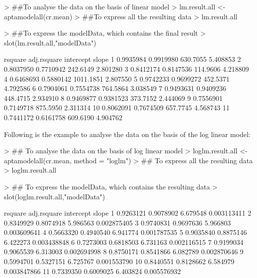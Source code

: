\documentclass[11pt]{article}
\begin{document}
\begin{Schunk}
\begin{Sinput}
> ##To analyse the data on the basis of linear model
> lm.result.all <- aptamodelall(cr.mean)
> ##To express all the resulting data
> lm.result.all
\end{Sinput}
\end{Schunk}

\begin{Schunk}
\begin{Sinput}
> ##To express the modelData, which contains the final result
> slot(lm.result.all,"modelData")
\end{Sinput}
\begin{Soutput}
     rsquare adj.rsquare intercept    slope
1  0.9935984   0.9919980  630.7055 5.408853
2  0.8037950   0.7710942  242.6149 2.801280
3  0.8412174   0.8147536  114.9606 4.218809
4  0.6468693   0.5880142 1011.1851 2.807550
5  0.9742233   0.9699272  452.5371 4.792586
6  0.7904061   0.7554738  764.5864 3.038549
7  0.9493631   0.9409236  448.4715 2.934910
8  0.9469877   0.9381523  373.7152 2.444069
9  0.7556901   0.7149718  875.5950 2.311314
10 0.8062091   0.7674509  657.7745 4.568743
11 0.7441172   0.6161758  609.6190 4.904762
\end{Soutput}
\end{Schunk}

Following is the example to analyse the data on the basis of the log linear model:
\begin{Schunk}
\begin{Sinput}
> ## To analyse the data on the basis of log linear model
> loglm.result.all <- aptamodelall(cr.mean, method = "loglm")
> ## To express all the resulting data
> loglm.result.all
\end{Sinput}
\end{Schunk}


\begin{Schunk}
\begin{Sinput}
> ## To express the modelData, which contains the resulting data
> slot(loglm.result.all,"modelData")
\end{Sinput}
\begin{Soutput}
     rsquare adj.rsquare intercept       slope
1  0.9263121   0.9078902  6.679548 0.003113411
2  0.8349929   0.8074918  5.986563 0.002875405
3  0.9740831   0.9697636  5.966803 0.003609641
4  0.5663320   0.4940540  6.941774 0.001787535
5  0.9035840   0.8875146  6.422273 0.003438848
6  0.7273003   0.6818503  6.731163 0.002116515
7  0.9199034   0.9065539  6.313003 0.002694998
8  0.8750171   0.8541866  6.082789 0.002870646
9  0.5994701   0.5327151  6.725767 0.001553790
10 0.8440551   0.8128662  6.584979 0.003847866
11 0.7339350   0.6009025  6.403824 0.005576932
\end{Soutput}
\end{Schunk}
\end{document}
